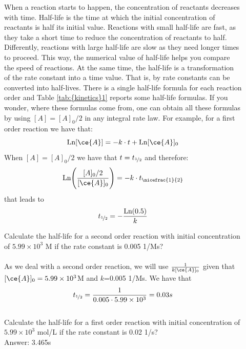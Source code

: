 \documentclass[main.tex]{subfiles}
\newcommand\chapterlabel{kinetics}
\begin{document}
\begin{description}
\item[] 
When a reaction starts to happen, the concentration of reactants decreases with time. Half-life is the time at which the initial concentration of reactants is half its initial value. Reactions with small half-life are fast, as they take a short time to reduce the concentration of reactants to half. Differently, reactions with large half-life are slow as they need longer times to proceed. This way, the numerical value of half-life helps you compare the speed of reactions. At the same time, the half-life is a transformation of the rate constant into a time value. That is, by rate constants can be converted into half-lives.
There is a single half-life formula for each reaction order and Table \ref{tab:{\chapterlabel}1} reports some half-life formulas. 
If you wonder, where these formulas come from, one can obtain all these formulas by using $[A]=[A]_0/2$ in any integral rate law. For example, for a first order reaction we have that:
\[\text{Ln}[\ce{A}]=-k\cdot t+\text{Ln}[\ce{A}]_0 \]
When $[A]=[A]_0/2$ we have that $t=t_{\nicefrac{1}{2}}$ and therefore:
\[\text{Ln}\Bigg(\frac{[A]_0/2}{[\ce{A}]_0}\Bigg)=-k\cdot t_{\nicefrac{1}{2}}\] that leads to
\[t_{\nicefrac{1}{2}}=-\frac{\text{Ln}(0.5)}{k} \]\begin{example} %
Calculate the half-life for a second order reaction with initial concentration of $5.99\times 10^3$ M if the rate constant is 0.005 1/Ms? 
\\
\\
As we deal with a second order reaction, we will use $\frac{1}{k[\ce{A}]_0}$ given that $[\ce{A}]_0=5.99\times 10^3$M and $k$=0.005 1/Ms. We have that
\[t_{\nicefrac{1}{2}}=\frac{1}{0.005\cdot 5.99\times 10^3}=0.03s\]
\faDiamond\ \\
Calculate the half-life for a first order reaction with initial concentration of $5.99\times 10^3$ mol/L if the rate constant is 0.02 1/s? \\
\flushright Answer:   3.465s
\end{example}%
\end{description}
\end{document}

